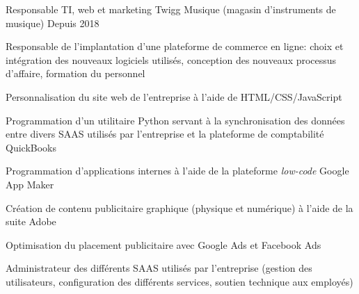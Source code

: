 

\begin{cventries}

  \cventry
    {Responsable TI, web et marketing} %
    {Twigg Musique (magasin d'instruments de musique)} %
    {} %
    {Depuis 2018} %
    {
      \begin{cvitems} %
        \item {Responsable de l'implantation d'une plateforme de commerce en ligne: choix et intégration des nouveaux logiciels utilisés, conception des nouveaux processus d'affaire, formation du personnel}
        \item {Personnalisation du site web de l'entreprise à l'aide de HTML/CSS/JavaScript}
        \item {Programmation d'un utilitaire Python servant à la synchronisation des données entre divers SAAS utilisés par l'entreprise et la plateforme de comptabilité QuickBooks}
        \item {Programmation d'applications internes à l'aide de la plateforme \emph{low-code} Google App Maker}
        \item {Création de contenu publicitaire graphique (physique et numérique) à l'aide de la suite Adobe}
        \item {Optimisation du placement publicitaire avec Google Ads et Facebook Ads}
        \item {Administrateur des différents SAAS utilisés par l'entreprise (gestion des utilisateurs, configuration des différents services, soutien technique aux employés)}
      \end{cvitems}
    }

\end{cventries}
